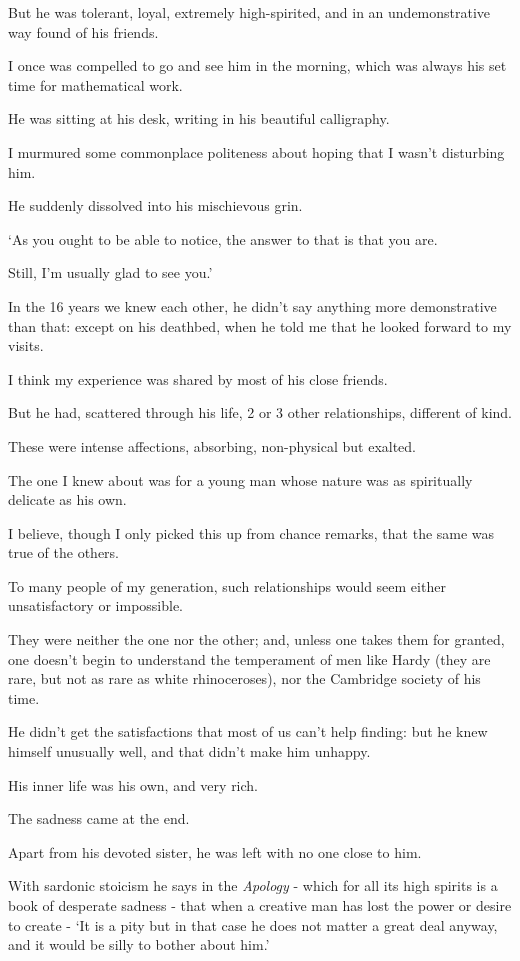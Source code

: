 \documentclass{article}
\numberwithin{equation}{section}
\begin{document}
But he was tolerant, loyal, extremely high-spirited, and in an undemonstrative way found of his friends.

I once was compelled to go and see him in the morning, which was always his set time for mathematical work.

He was sitting at his desk, writing in his beautiful calligraphy.

I murmured some commonplace politeness about hoping that I wasn't disturbing him.

He suddenly dissolved into his mischievous grin.

`As you ought to be able to notice, the answer to that is that you are.

Still, I'm usually glad to see you.'

In the 16 years we knew each other, he didn't say anything more demonstrative than that: except on his deathbed, when he told me that he looked forward to my visits.

%
I think my experience was shared by most of his close friends.

But he had, scattered through his life, 2 or 3 other relationships, different of kind.

These were intense affections, absorbing, non-physical but exalted.

The one I knew about was for a young man whose nature was as spiritually delicate as his own.

I believe, though I only picked this up from chance remarks, that the same was true of the others.

To many people of my generation, such relationships would seem either unsatisfactory or impossible.

They were neither the one nor the other; and, unless one takes them for granted, one doesn't begin to understand the temperament of men like Hardy (they are rare, but not as rare as white rhinoceroses), nor the Cambridge society of his time.

He didn't get the satisfactions that most of us can't help finding: but he knew himself unusually well, and that didn't make him unhappy.

His inner life was his own, and very rich.

The sadness came at the end.

Apart from his devoted sister, he was left with no one close to him.

%
With sardonic stoicism he says in the \textit{Apology} - which for all its high spirits is a book of desperate sadness - that when a creative man has lost the power or desire to create - `It is a pity but in that case he does not matter a great deal anyway, and it would be silly to bother about him.'
\end{document}
